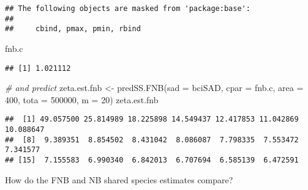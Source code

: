 \documentclass[
]{article}
\newenvironment{Shaded}{\begin{snugshade}}{\end{snugshade}}
\newcommand{\AttributeTok}[1]{\textcolor[rgb]{0.77,0.63,0.00}{#1}}
\newcommand{\CommentTok}[1]{\textcolor[rgb]{0.56,0.35,0.01}{\textit{#1}}}
\newcommand{\DecValTok}[1]{\textcolor[rgb]{0.00,0.00,0.81}{#1}}
\newcommand{\FunctionTok}[1]{\textcolor[rgb]{0.00,0.00,0.00}{#1}}
\newcommand{\NormalTok}[1]{#1}
\newcommand{\OtherTok}[1]{\textcolor[rgb]{0.56,0.35,0.01}{#1}}
\begin{document}
\begin{verbatim}
## The following objects are masked from 'package:base':
## 
##     cbind, pmax, pmin, rbind
\end{verbatim}

\begin{Shaded}
\begin{Highlighting}[]
\NormalTok{fnb.c}
\end{Highlighting}
\end{Shaded}

\begin{verbatim}
## [1] 1.021112
\end{verbatim}

\begin{Shaded}
\begin{Highlighting}[]
\CommentTok{\# and predict}
\NormalTok{zeta.est.fnb }\OtherTok{\textless{}{-}} \FunctionTok{predSS.FNB}\NormalTok{(}\AttributeTok{sad =}\NormalTok{ bciSAD, }\AttributeTok{cpar =}\NormalTok{ fnb.c, }\AttributeTok{area =} \DecValTok{400}\NormalTok{, }\AttributeTok{tota =} \DecValTok{500000}\NormalTok{, }\AttributeTok{m =} \DecValTok{20}\NormalTok{)}
\NormalTok{zeta.est.fnb}
\end{Highlighting}
\end{Shaded}

\begin{verbatim}
##  [1] 49.057500 25.814989 18.225898 14.549437 12.417853 11.042869 10.088647
##  [8]  9.389351  8.854502  8.431042  8.086087  7.798335  7.553472  7.341577
## [15]  7.155583  6.990340  6.842013  6.707694  6.585139  6.472591
\end{verbatim}

How do the FNB and NB shared species estimates compare?
\end{document}
